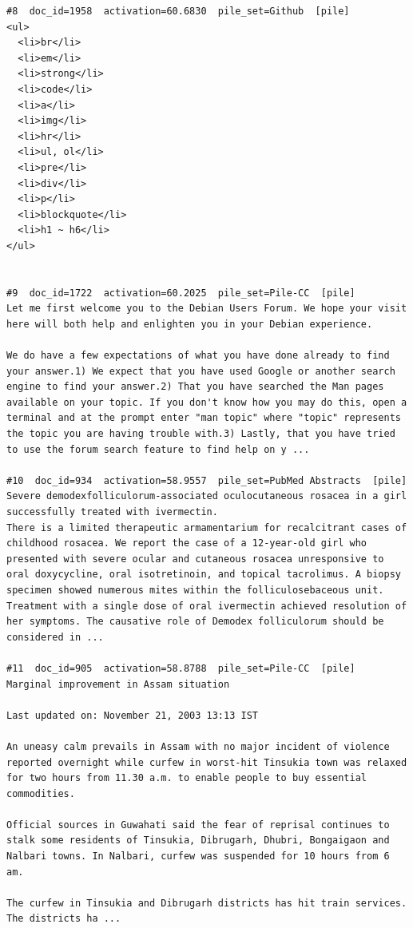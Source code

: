 \begin{verbatim}
#8  doc_id=1958  activation=60.6830  pile_set=Github  [pile]
<ul>
  <li>br</li>
  <li>em</li>
  <li>strong</li>
  <li>code</li>
  <li>a</li>
  <li>img</li>
  <li>hr</li>
  <li>ul, ol</li>
  <li>pre</li>
  <li>div</li>
  <li>p</li>
  <li>blockquote</li>
  <li>h1 ~ h6</li>
</ul>


#9  doc_id=1722  activation=60.2025  pile_set=Pile-CC  [pile]
Let me first welcome you to the Debian Users Forum. We hope your visit here will both help and enlighten you in your Debian experience.

We do have a few expectations of what you have done already to find your answer.1) We expect that you have used Google or another search engine to find your answer.2) That you have searched the Man pages available on your topic. If you don't know how you may do this, open a terminal and at the prompt enter "man topic" where "topic" represents the topic you are having trouble with.3) Lastly, that you have tried to use the forum search feature to find help on y ...

#10  doc_id=934  activation=58.9557  pile_set=PubMed Abstracts  [pile]
Severe demodexfolliculorum-associated oculocutaneous rosacea in a girl successfully treated with ivermectin.
There is a limited therapeutic armamentarium for recalcitrant cases of childhood rosacea. We report the case of a 12-year-old girl who presented with severe ocular and cutaneous rosacea unresponsive to oral doxycycline, oral isotretinoin, and topical tacrolimus. A biopsy specimen showed numerous mites within the folliculosebaceous unit. Treatment with a single dose of oral ivermectin achieved resolution of her symptoms. The causative role of Demodex folliculorum should be considered in ...

#11  doc_id=905  activation=58.8788  pile_set=Pile-CC  [pile]
Marginal improvement in Assam situation

Last updated on: November 21, 2003 13:13 IST

An uneasy calm prevails in Assam with no major incident of violence reported overnight while curfew in worst-hit Tinsukia town was relaxed for two hours from 11.30 a.m. to enable people to buy essential commodities.

Official sources in Guwahati said the fear of reprisal continues to stalk some residents of Tinsukia, Dibrugarh, Dhubri, Bongaigaon and Nalbari towns. In Nalbari, curfew was suspended for 10 hours from 6 am.

The curfew in Tinsukia and Dibrugarh districts has hit train services. The districts ha ...


\end{verbatim}
